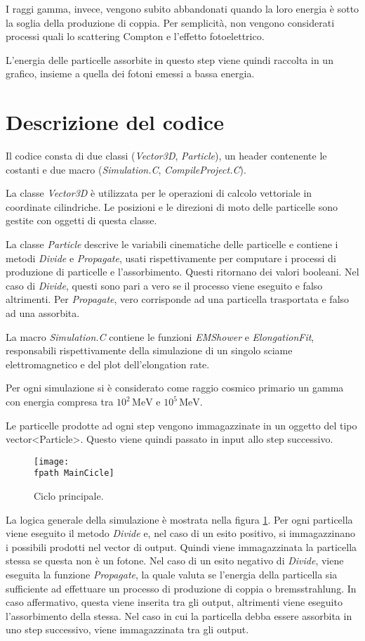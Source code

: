 \documentclass[10pt,a4paper,usenatbib]{article}
\newcommand*{\unit}[1]{\ensuremath{\mathrm{\,#1}}}                              %
\newcommand{\fpath}{./Figs/}
\begin{document}
I raggi gamma, invece, vengono subito abbandonati quando la loro energia è sotto la soglia della produzione di coppia.
Per semplicità, non vengono considerati processi quali lo scattering Compton e l'effetto fotoelettrico. 

L'energia delle particelle assorbite in questo step viene quindi raccolta in un grafico, insieme a quella dei fotoni emessi a bassa energia.

\section{Descrizione del codice}
Il codice consta di due classi (\textit{Vector3D}, \textit{Particle}), un header contenente le costanti e due macro (\textit{Simulation.C}, \textit{CompileProject.C}).
 
La classe \textit{Vector3D} è utilizzata per le operazioni di calcolo vettoriale in coordinate cilindriche. Le posizioni e le direzioni di moto delle particelle sono gestite con oggetti di questa classe.

La classe \textit{Particle} descrive le variabili cinematiche delle particelle e contiene i metodi \textit{Divide} e \textit{Propagate}, usati rispettivamente per computare i processi di produzione di particelle e l'assorbimento. Questi ritornano dei valori booleani. Nel caso di \textit{Divide}, questi sono pari a vero se il processo viene eseguito e falso altrimenti. Per \textit{Propagate}, vero corrisponde ad una particella trasportata e falso ad una assorbita.

La macro \textit{Simulation.C} contiene le funzioni \textit{EMShower} e \textit{ElongationFit}, responsabili rispettivamente della simulazione di un singolo sciame elettromagnetico e del plot dell'elongation rate.

Per ogni simulazione si è considerato come raggio cosmico primario un gamma con energia compresa tra $10^2\unit{MeV}$ e $10^5\unit{MeV}$. 

Le particelle prodotte ad ogni step vengono immagazzinate in un oggetto del tipo vector<Particle>. Questo viene quindi passato in input allo step successivo.

\begin{figure} [h!]
\centering
\texttt{[image: \\fpath MainCicle]}
\caption{Ciclo principale. }
\label{img:MainCicle}
\end{figure} 

La logica generale della simulazione è mostrata nella figura \ref{img:MainCicle}. Per ogni particella viene eseguito il metodo \textit{Divide} e, nel caso di un esito positivo, si immagazzinano i possibili prodotti nel vector di output. Quindi viene immagazzinata la particella stessa se questa non è un fotone. Nel caso di un esito negativo di \textit{Divide}, viene eseguita la funzione \textit{Propagate}, la quale valuta se l'energia della particella sia sufficiente ad effettuare un processo di produzione di coppia o bremsstrahlung. In caso affermativo, questa viene inserita tra gli output, altrimenti viene eseguito l'assorbimento della stessa. Nel caso in cui la particella debba essere assorbita in uno step successivo, viene immagazzinata tra gli output. 
\end{document}
